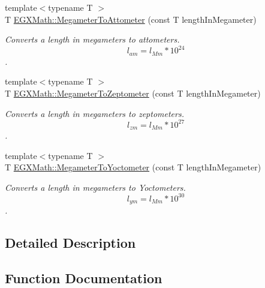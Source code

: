 \begin{DoxyCompactItemize}
{\footnotesize template$<$typename T $>$ }\\T \mbox{\hyperlink{group___e_g_x_math-_conversions-_length_conversions-_megameter-_s_i_ga13016f40e740def54199de991815f422}{E\+G\+X\+Math\+::\+Megameter\+To\+Attometer}} (const T length\+In\+Megameter)
\begin{DoxyCompactList}\small\item\em Converts a length in megameters to attometers. \[ l_{am}=l_{Mm} * 10^{24} \]. \end{DoxyCompactList}\item 
{\footnotesize template$<$typename T $>$ }\\T \mbox{\hyperlink{group___e_g_x_math-_conversions-_length_conversions-_megameter-_s_i_ga38fee336ea865f1f7ec6541c2256a8fe}{E\+G\+X\+Math\+::\+Megameter\+To\+Zeptometer}} (const T length\+In\+Megameter)
\begin{DoxyCompactList}\small\item\em Converts a length in megameters to zeptometers. \[ l_{zm}=l_{Mm} * 10^{27} \]. \end{DoxyCompactList}\item 
{\footnotesize template$<$typename T $>$ }\\T \mbox{\hyperlink{group___e_g_x_math-_conversions-_length_conversions-_megameter-_s_i_gac9b71989abb5a622818f01c5bdbe7285}{E\+G\+X\+Math\+::\+Megameter\+To\+Yoctometer}} (const T length\+In\+Megameter)
\begin{DoxyCompactList}\small\item\em Converts a length in megameters to Yoctometers. \[ l_{ym}=l_{Mm} * 10^{30} \]. \end{DoxyCompactList}\end{DoxyCompactItemize}


\subsection{Detailed Description}


\subsection{Function Documentation}
\mbox{\label{group___e_g_x_math-_conversions-_length_conversions-_megameter-_s_i_ga13016f40e740def54199de991815f422}} 
